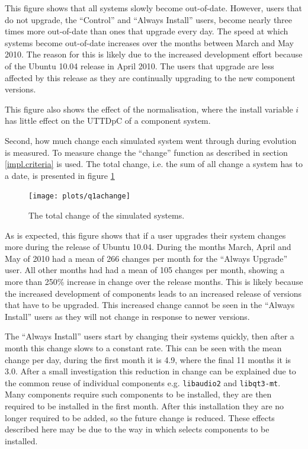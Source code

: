 This figure shows that all systems slowly become out-of-date.
However, users that do not upgrade, the ``Control'' and ``Always Install'' users, become nearly three times more out-of-date than ones that upgrade every day.
The speed at which systems become out-of-date increases over the months between March and May 2010.
The reason for this is likely due to the increased development effort because of the Ubuntu 10.04 release in April 2010.
The users that upgrade are less affected by this release as they are continually upgrading to the new component versions.

This figure also shows the effect of the normalisation, where the install variable $i$ has little effect on the UTTDpC of a component system.

Second, how much change each simulated system went through during evolution is measured.
To measure change the ``change'' function as described in section \ref{impl.criteria} is used.
The total change, i.e. the sum of all change a system has to a date, is presented in figure \ref{exp.q1achange}
\begin{figure}[htp]
\begin{center}
  \texttt{[image: plots/q1achange]}
  \caption{The total change of the simulated systems.}
  \label{exp.q1achange}
\end{center}
\end{figure}

As is expected, this figure shows that if a user upgrades their system changes more during the release of Ubuntu 10.04.
During the months March, April and May of 2010 had a mean of 266 changes per month for the ``Always Upgrade'' user.
All other months had had a mean of 105 changes per month, showing a more than 250\% increase in change over the release months.
This is likely because the increased development of components leads to an increased release of versions that have to be upgraded.
This increased change cannot be seen in the ``Always Install'' users as they will not change in response to newer versions.

The ``Always Install'' users start by changing their systems quickly, then after a month this change slows to a constant rate.
This can be seen with the mean change per day, during the first month it is 4.9, where the final 11 months it is 3.0.
After a small investigation this reduction in change can be explained due to the common reuse of individual components e.g. \texttt{libaudio2} and \texttt{libqt3-mt}.
Many components require such components to be installed, they are then required to be installed in the first month.
After this installation they are no longer required to be added, so the future change is reduced. 
These effects described here may be due to the way in which \usermodel selects components to be installed.

